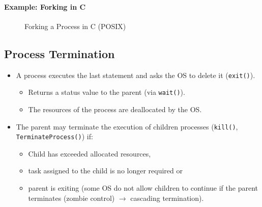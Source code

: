 \documentclass[a4paper, 11pt, accentcolor = tud3b]{tudreport}
\begin{document}
	            \paragraph{Example: Forking in C}
		            \begin{figure}[H]
		            	\centering
		            	
		            	\caption{Forking a Process in C (POSIX)}
		            \end{figure}

            \subsection{Process Termination}
                \begin{itemize}
                	\item A process executes the last statement and asks the OS to delete it (\texttt{exit()}).
	                	\begin{itemize}
	                		\item Returns a status value to the parent (via \texttt{wait()}).
	                		\item The resources of the process are deallocated by the OS.
	                	\end{itemize}
                	\item The parent may terminate the execution of children processes (\texttt{kill()}, \texttt{TerminateProcess()}) if:
	                	\begin{itemize}
	                		\item Child has exceeded allocated resources,
	                		\item task assigned to the child is no longer required or
	                		\item parent is exiting (some OS do not allow children to continue if the parent terminates (zombie control) \(\rightarrow\) cascading termination).
	                	\end{itemize}
                \end{itemize}
\end{document}
